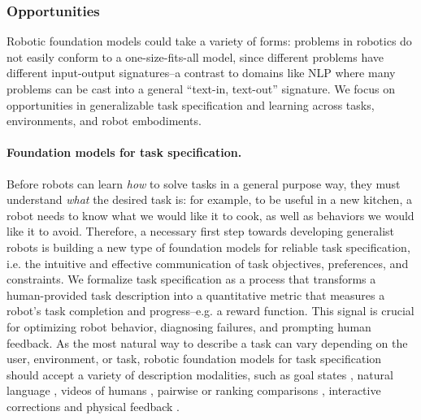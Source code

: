 \subsubsection{Opportunities}
\label{sec:robotics-opportunities}

Robotic foundation models could take a variety of forms: problems in robotics do not easily conform to a one-size-fits-all model, since different problems have different input-output signatures--a contrast to domains like NLP where many problems can be cast into a general ``text-in, text-out'' signature. We focus on opportunities in generalizable task specification and learning across tasks, environments, and robot embodiments.

\paragraph{Foundation models for task specification.} Before robots can learn \textit{how} to solve tasks in a general purpose way, they must understand \textit{what} the desired task is: for example, to be useful in a new kitchen, a robot needs to know what we would like it to cook, as well as behaviors we would like it to avoid. Therefore, a necessary first step towards developing generalist robots is building a new type of foundation models for reliable task specification, i.e. the intuitive and effective communication of task objectives, preferences, and constraints. We formalize task specification as a process that transforms a human-provided task description into a quantitative metric that measures a robot’s task completion and progress--e.g. a reward function. This signal is crucial for optimizing robot behavior, diagnosing failures, and prompting human feedback. As the most natural way to describe a task can vary depending on the user, environment, or task, robotic foundation models for task specification should accept a variety of description modalities, such as goal states \citep{fu2018variational, singh2019endtoend}, natural language \citep{macglashan2015grounding, karamcheti2017draggns, misra2017mapping, coreyes2019guiding, shao2020concept2robot}, videos of humans \citep{shao2020concept2robot, chen2021generalizable, liu2018imitation}, pairwise or ranking comparisons \citep{biyik2018batch}, interactive corrections \citep{coreyes2019guiding, karamcheti2020decomposition} and physical feedback \citep{ross2011reduction, bajcsy2017learning}.

